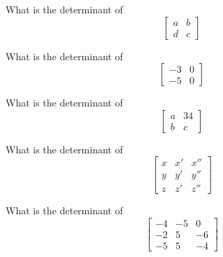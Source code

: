 
\bexo
What is the determinant of 
\begin{equation*}
\left[
\begin{array}{cc}
a & b \\
d & c
\end{array}
\right]
\end{equation*}
\eexo{}


\bexo
What is the determinant of 
\begin{equation*}
\left[
\begin{array}{cc}
-3 & 0 \\
-5 & 0
\end{array}
\right]
\end{equation*}

\eexo{}




\bexo
What is the determinant of 
\begin{equation*}
\left[
\begin{array}{cc}
a & 34 \\
b & c
\end{array}
\right]
\end{equation*}

\eexo{}




\bexo
What is the determinant of 
\begin{equation*}
\left[
\begin{array}{ccc}
x & x' & x'' \\
y & y' & y''\\
z & z' & z''
\end{array}
\right]
\end{equation*}
\eexo{}


\bexo
What is the determinant of 
\begin{equation*}
\left[
\begin{array}{ccc}
    -4  &  -5  &   0\\
    -2  &   5  &  -6\\
    -5  &   5  &  -4
\end{array}
\right]
\end{equation*}

